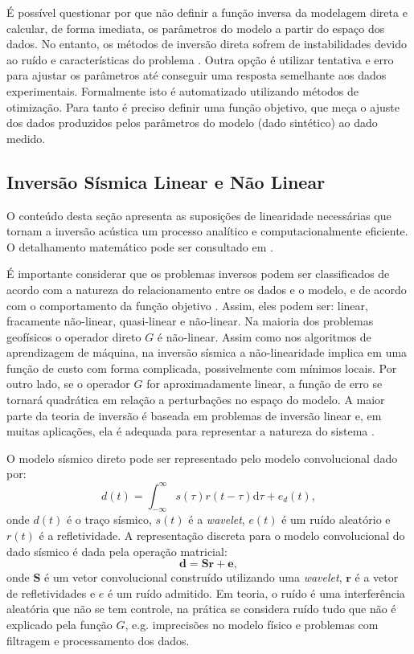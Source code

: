 É possível questionar por que não definir a
função inversa da modelagem direta e calcular, de forma imediata,
os parâmetros do modelo a partir do espaço dos dados.
No entanto, os métodos de inversão direta sofrem de instabilidades
devido ao ruído e características do problema \citep[p. 50]{sen_livro}. Outra
opção é utilizar tentativa e erro para ajustar os parâmetros até conseguir uma
resposta semelhante aos dados experimentais. Formalmente isto é automatizado
utilizando métodos de otimização. Para tanto é preciso definir uma função
objetivo, que meça o ajuste dos dados produzidos pelos
parâmetros do modelo (dado sintético) ao dado medido.

\subsection{Inversão Sísmica Linear e Não Linear}
O conteúdo desta seção apresenta as suposições de linearidade necessárias
que tornam a inversão acústica um processo analítico e computacionalmente
eficiente. O detalhamento matemático pode ser consultado em \cite{leandroGRSL,Figueiredo17}.

É importante considerar que os problemas inversos podem ser classificados de acordo com a natureza
do relacionamento entre os dados e o modelo, e de acordo com o comportamento da função objetivo \citep{sen_livro}.
Assim, eles podem ser: linear, fracamente não-linear, quasi-linear e não-linear.
Na maioria dos problemas geofísicos o operador direto $G$ é não-linear.
Assim como nos algoritmos de aprendizagem de máquina, na inversão sísmica
a não-linearidade implica em uma função de custo com forma complicada,
possivelmente com mínimos locais.
Por outro lado, se o operador $G$ for aproximadamente linear, a
função de erro se tornará quadrática em relação a perturbações
no espaço do modelo. A maior parte da teoria de inversão é baseada em problemas
de inversão linear e, em muitas aplicações, ela é 
adequada para representar a natureza do sistema \cite{sen_livro}.

O modelo sísmico direto pode ser representado pelo modelo convolucional dado por:
\begin{equation}
d(t) = \int_{-\infty}^{\infty} s(\tau) r(t - \tau)\mathrm{d}\tau + e_{d}(t),
\label{eq:conmodel}
\end{equation}
onde $d(t)$ é o traço sísmico, $s(t)$ é a \textit{wavelet}, $e(t)$ é
um ruído aleatório e $r(t)$ é a refletividade.
A representação discreta para o modelo convolucional do dado sísmico é
dada pela operação matricial: 
\begin{equation}
\label{eq:sismDiscreta}
\mathbf{d = Sr + e},
\end{equation}
onde $\mathbf{S}$ é um vetor convolucional construído utilizando uma
\textit{wavelet}, $\mathbf{r}$ é a vetor de refletividades e $e$ é um
ruído admitido. Em teoria, o ruído é uma interferência aleatória que não se tem
controle, na prática se considera ruído tudo que não é explicado pela função
$G$, e.g. imprecisões no modelo físico e problemas com filtragem e processamento
dos dados.


